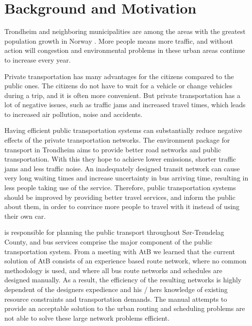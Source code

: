 \section{Background and Motivation}

Trondheim and neighboring municipalities are among the areas with the greatest population growth in Norway \citep{website:miljopakken}. More people means more traffic, and without action will congestion and environmental problems in these urban areas continue to increase every year. 

Private transportation has many advantages for the citizens compared to the public ones. The citizens do not have to wait for a vehicle or change vehicles during a trip, and it is often more convenient. But private transportation has a lot of negative issues, such as traffic jams and increased travel times, which leads to increased air pollution, noise and accidents. 

Having efficient public transportation systems can substantially reduce negative effects of the private transportation networks. The environment package \citep{website:miljopakken} for transport in Trondheim aims to provide better road networks and public transportation. With this they hope to achieve lower emissions, shorter traffic jams and less traffic noise. An inadequately designed transit network can cause very long waiting times and increase uncertainty in bus arriving time, resulting in less people taking use of the service. Therefore, public transportation systems should be improved by providing better travel services, and inform the public about them, in order to convince more people to travel with it instead of using their own car. 

\citet{website:atb} is responsible for planning the public transport throughout Sør-Trøndelag County, and bus services comprise the major component of the public transportation system. From a meeting with AtB we learned that the current solution of AtB consists of an experience based route network, where no common methodology is used, and where all bus route networks and schedules are designed manually. As a result, the efficiency of the resulting networks is highly dependent of the designers expedience and his / hers knowledge of existing resource constraints and transportation demands. The manual attempts to provide an acceptable solution to the urban routing and scheduling problems are not able to solve these large network problems efficient.

